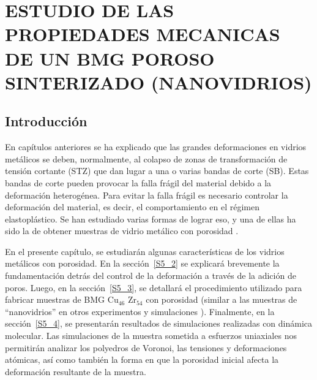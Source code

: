
\chapter{ESTUDIO DE LAS PROPIEDADES MECANICAS DE UN BMG POROSO SINTERIZADO (NANOVIDRIOS)} %

\label{C5} %




\section{Introducción}
\label{S5_1}

En capítulos anteriores se ha explicado que las grandes deformaciones en vidrios metálicos se deben, normalmente,
al colapso de zonas de transformación de tensión cortante (STZ) que dan lugar a una o varias bandas de corte (SB).
Estas bandas de corte pueden provocar la falla frágil del material debido a la deformación heterogénea.
Para evitar la falla frágil es necesario controlar la deformación del material, es decir, el comportamiento en el régimen elastoplástico.
Se han estudiado varias formas de lograr eso, y una de ellas ha sido la de obtener muestras de vidrio metálico con porosidad 
\citep{guan13,wang10,schuh07,liontas14}.

En el presente capítulo, se estudiarán algunas características de los vidrios metálicos con porosidad. En la sección~\ref{S5_2} se explicará
brevemente la fundamentación detrás del control de la deformación a través de la adición de poros.
Luego, en la sección~\ref{S5_3}, se detallará el procedimiento utilizado para fabricar muestras de BMG Cu$_{46}$ Zr$_{54}$ con porosidad
(similar a las muestras de ``nanovidrios'' en otros experimentos y simulaciones \citep{adibi13,albe13}). Finalmente, en la sección~\ref{S5_4},
se presentarán resultados de simulaciones
realizadas con dinámica molecular. Las simulaciones de la muestra sometida a esfuerzos uniaxiales nos permitirán analizar los polyedros
de Voronoi, las tensiones y deformaciones atómicas, así como también la forma en que la porosidad inicial afecta la deformación resultante
de la muestra.

